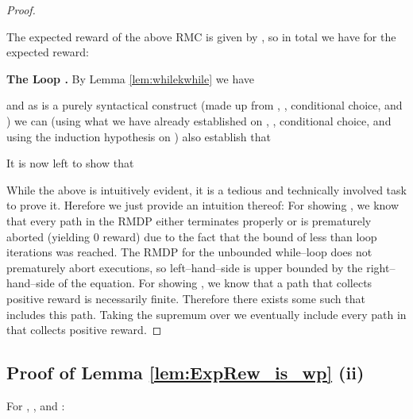 \begin{proof}
\begin{center}
 \end{center}The expected reward of the above RMC is given by , so in total we have for the expected reward:


\textbf{The Loop .} By Lemma \ref{lem:whilekwhile} we have

and as  is a purely syntactical construct (made up from \Abort, \Skip, conditional choice, and ) we can (using what we have already established on \Abort, \Skip, conditional choice, and using the induction hypothesis on ) also establish that

It is now left to show that

While the above is intuitively evident, it is a tedious and technically involved task to prove it. 
Herefore we just provide an intuition thereof:
For showing , we know that every path in the RMDP  either terminates properly or is prematurely aborted (yielding 0 reward) due to the fact that the bound of less than  loop iterations was reached. The RMDP  for the unbounded while--loop does not prematurely abort executions, so left--hand--side is upper bounded by the right--hand--side of the equation. 
For showing , we know that a path that collects positive reward is necessarily finite. Therefore there exists some  such that  includes this path. Taking the supremum over  we eventually include every path  in  that collects positive reward.
\end{proof}




\subsection{Proof of Lemma \ref{lem:ExpRew_is_wp} (ii)}

\label{proofof:LExpRew_is_wlp}

\begingroup
\def\thelemma{\ref{lem:ExpRew_is_wp} (ii)}
\begin{lemma}
For , , and :

\end{lemma}
\addtocounter{lemma}{-1}
\endgroup

